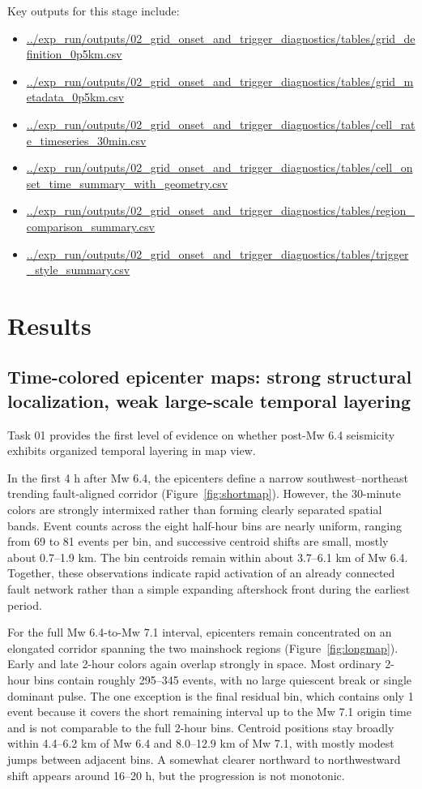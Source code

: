 \documentclass[11pt]{article}
\begin{document}
Key outputs for this stage include:
\begin{itemize}[leftmargin=1.5em]
    \item \url{../exp_run/outputs/02_grid_onset_and_trigger_diagnostics/tables/grid_definition_0p5km.csv}
    \item \url{../exp_run/outputs/02_grid_onset_and_trigger_diagnostics/tables/grid_metadata_0p5km.csv}
    \item \url{../exp_run/outputs/02_grid_onset_and_trigger_diagnostics/tables/cell_rate_timeseries_30min.csv}
    \item \url{../exp_run/outputs/02_grid_onset_and_trigger_diagnostics/tables/cell_onset_time_summary_with_geometry.csv}
    \item \url{../exp_run/outputs/02_grid_onset_and_trigger_diagnostics/tables/region_comparison_summary.csv}
    \item \url{../exp_run/outputs/02_grid_onset_and_trigger_diagnostics/tables/trigger_style_summary.csv}
\end{itemize}

\section{Results}
\subsection{Time-colored epicenter maps: strong structural localization, weak large-scale temporal layering}
Task 01 provides the first level of evidence on whether post-Mw 6.4 seismicity exhibits organized temporal layering in map view.

In the first 4 h after Mw 6.4, the epicenters define a narrow southwest--northeast trending fault-aligned corridor (Figure~\ref{fig:shortmap}). However, the 30-minute colors are strongly intermixed rather than forming clearly separated spatial bands. Event counts across the eight half-hour bins are nearly uniform, ranging from 69 to 81 events per bin, and successive centroid shifts are small, mostly about 0.7--1.9 km. The bin centroids remain within about 3.7--6.1 km of Mw 6.4. Together, these observations indicate rapid activation of an already connected fault network rather than a simple expanding aftershock front during the earliest period.

For the full Mw 6.4-to-Mw 7.1 interval, epicenters remain concentrated on an elongated corridor spanning the two mainshock regions (Figure~\ref{fig:longmap}). Early and late 2-hour colors again overlap strongly in space. Most ordinary 2-hour bins contain roughly 295--345 events, with no large quiescent break or single dominant pulse. The one exception is the final residual bin, which contains only 1 event because it covers the short remaining interval up to the Mw 7.1 origin time and is not comparable to the full 2-hour bins. Centroid positions stay broadly within 4.4--6.2 km of Mw 6.4 and 8.0--12.9 km of Mw 7.1, with mostly modest jumps between adjacent bins. A somewhat clearer northward to northwestward shift appears around 16--20 h, but the progression is not monotonic.
\end{document}
